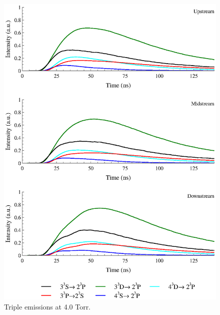 \begin{figure}
  \centering
  \includegraphics{./chapters/extraem/figures/4torr_t.eps}
  \caption{Triple emissions at 4.0 Torr.}
\end{figure}

